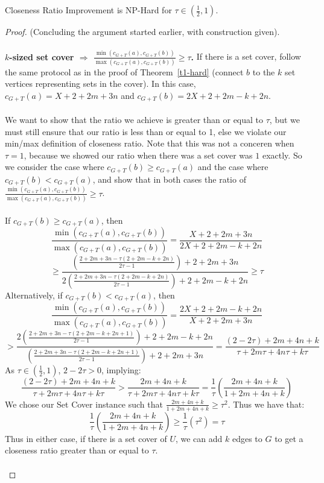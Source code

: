 \begin{theorem} \label{t2-hard}
    Closeness Ratio Improvement is NP-Hard for $\tau\in(\frac{1}{2},1)$.
\end{theorem}
\begin{proof}
    (Concluding the argument started earlier, with construction given).\\\\
    \textbf{$k$-sized set cover $\Longrightarrow$ $\frac{\min(c_{G+T}(a),c_{G+T}(b))}{\max(c_{G+T}(a),c_{G+T}(b))}\geq\tau$.} If there is a set cover, follow the same protocol as in the proof of Theorem~\ref{t1-hard} (connect $b$ to the $k$ set vertices representing sets in the cover). In this case, $c_{G+T}(a)=X+2+2m+3n$ and $c_{G+T}(b)=2X+2+2m-k+2n$. \\\\
    We want to show that the ratio we achieve is greater than or equal to $\tau$, but we must still ensure that our ratio is less than or equal to 1, else we violate our min/max definition of closeness ratio. Note that this was not a conceren when $\tau=1$, because we showed our ratio when there was a set cover was $1$ exactly. So we consider the case where $c_{G+T}(b)\geq c_{G+T}(a)$ and the case where $c_{G+T}(b)<c_{G+T}(a)$, and show that in both cases the ratio of $\frac{\min(c_{G+T}(a),c_{G+T}(b))}{\max(c_{G+T}(a),c_{G+T}(b))}\geq\tau$.\\\\
    If $c_{G+T}(b)\geq c_{G+T}(a)$, then
    \[\frac{\min(c_{G+T}(a),c_{G+T}(b))}{\max(c_{G+T}(a),c_{G+T}(b))}=\frac{X+2+2m+3n}{2X+2+2m-k+2n}\]\[\geq\frac{(\frac{2+2m+3n-\tau(2+2m-k+2n)}{2\tau-1})+2+2m+3n}{2(\frac{2+2m+3n-\tau(2+2m-k+2n)}{2\tau-1})+2+2m-k+2n}\geq\tau\]
    Alternatively, if $c_{G+T}(b)<c_{G+T}(a)$, then
    \[\frac{\min(c_{G+T}(a),c_{G+T}(b))}{\max(c_{G+T}(a),c_{G+T}(b))}=\frac{2X+2+2m-k+2n}{X+2+2m+3n}\]\[>\frac{2(\frac{2+2m+3n-\tau(2+2m-k+2n+1)}{2\tau-1})+2+2m-k+2n}{(\frac{2+2m+3n-\tau(2+2m-k+2n+1)}{2\tau-1})+2+2m+3n}=\frac{(2-2\tau)+2m+4n+k}{\tau+2m\tau+4n\tau+k\tau}\]
    As $\tau\in(\frac{1}{2},1)$, $2-2\tau>0$, implying:
    \[\frac{(2-2\tau)+2m+4n+k}{\tau+2m\tau+4n\tau+k\tau}>\frac{2m+4n+k}{\tau+2m\tau+4n\tau+k\tau}=\frac{1}{\tau}(\frac{2m+4n+k}{1+2m+4n+k})\]
    We chose our Set Cover instance such that $\frac{2m+4n+k}{1+2m+4n+k}\geq\tau^2$. Thus we have that:
    \[\frac{1}{\tau}(\frac{2m+4n+k}{1+2m+4n+k})\geq\frac{1}{\tau}(\tau^2)=\tau\]
    Thus in either case, if there is a set cover of $U$, we can add $k$ edges to $G$ to get a closeness ratio greater than or equal to $\tau$.\\\\

\end{proof}
